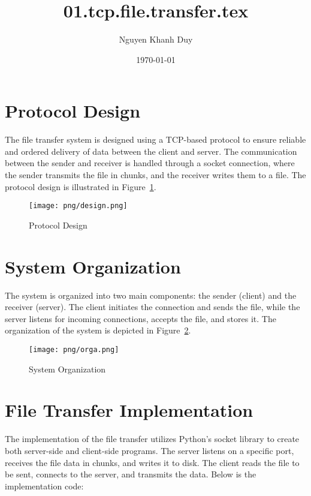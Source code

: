 \documentclass{article}
\title{01.tcp.file.transfer.tex}
\author{Nguyen Khanh Duy}
\date{\today}
\begin{document}
\maketitle

\section{Protocol Design}
The file transfer system is designed using a TCP-based protocol to ensure reliable and ordered delivery of data between the client and server. The communication between the sender and receiver is handled through a socket connection, where the sender transmits the file in chunks, and the receiver writes them to a file. The protocol design is illustrated in Figure~\ref{fig:protocol}.

\begin{figure}[h!]
    \centering
    \texttt{[image: png/design.png]} 
    \caption{Protocol Design}
    \label{fig:protocol}
\end{figure}

\section{System Organization}
The system is organized into two main components: the sender (client) and the receiver (server). The client initiates the connection and sends the file, while the server listens for incoming connections, accepts the file, and stores it. The organization of the system is depicted in Figure~\ref{fig:system}.

\begin{figure}[h!]
    \centering
    \texttt{[image: png/orga.png]} 
    \caption{System Organization}
    \label{fig:system}
\end{figure}

\section{File Transfer Implementation}
The implementation of the file transfer utilizes Python's socket library to create both server-side and client-side programs. The server listens on a specific port, receives the file data in chunks, and writes it to disk. The client reads the file to be sent, connects to the server, and transmits the data. Below is the implementation code:
\end{document}

